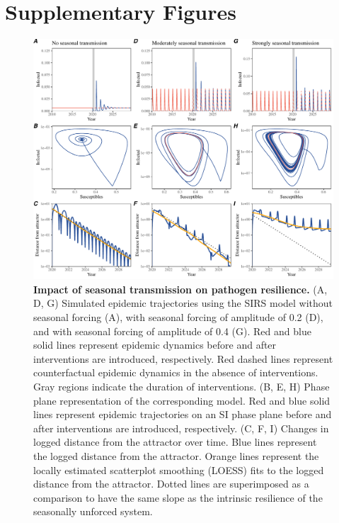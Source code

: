 \documentclass[12pt]{article}
\begin{document}
\pagebreak

\section*{Supplementary Figures}

\begin{figure}[!th]
\includegraphics[width=\textwidth]{../figure2/figure2_simple_seas.pdf}
\caption{
\textbf{Impact of seasonal transmission on pathogen resilience.}
(A, D, G) Simulated epidemic trajectories using the SIRS model without seasonal forcing (A), with seasonal forcing of amplitude of 0.2 (D), and with seasonal forcing of amplitude of 0.4 (G).
Red and blue solid lines represent epidemic dynamics before and after interventions are introduced, respectively.
Red dashed lines represent counterfactual epidemic dynamics in the absence of interventions.
Gray regions indicate the duration of interventions.
(B, E, H) Phase plane representation of the corresponding model.
Red and blue solid lines represent epidemic trajectories on an SI phase plane before and after interventions are introduced, respectively.
(C, F, I) Changes in logged distance from the attractor over time.
Blue lines represent the logged distance from the attractor.
Orange lines represent the locally estimated scatterplot smoothing (LOESS) fits to the logged distance from the attractor.
Dotted lines are superimposed as a comparison to have the same slope as the intrinsic resilience of the seasonally unforced system.
}
\end{figure}
\end{document}

